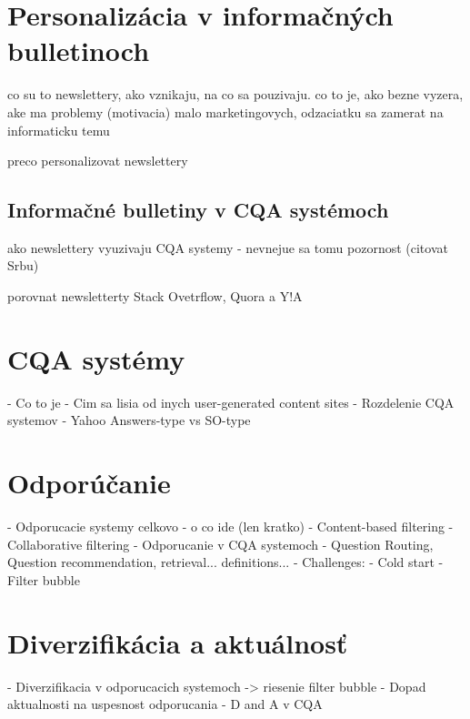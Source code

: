 
\newpage
\chapter{Personalizácia v informačných bulletinoch}

co su to newslettery, ako vznikaju, na co sa pouzivaju.
co to je, ako bezne vyzera, ake ma problemy (motivacia)
malo marketingovych, odzaciatku sa zamerat na informaticku temu

preco personalizovat newslettery

\section{Informačné bulletiny v CQA systémoch}

ako newslettery vyuzivaju CQA systemy - nevnejue sa tomu pozornost (citovat Srbu)

porovnat newsletterty Stack Ovetrflow, Quora a Y!A


\chapter{CQA systémy}

    - Co to je
    - Cim sa lisia od inych user-generated content sites
    - Rozdelenie CQA systemov - Yahoo Answers-type vs SO-type




\chapter{Odporúčanie}

- Odporucacie systemy celkovo - o co ide (len kratko)
    - Content-based filtering
    - Collaborative filtering
- Odporucanie v CQA systemoch
- Question Routing, Question recommendation, retrieval... definitions...
- Challenges:
    - Cold start
    - Filter bubble



\chapter{Diverzifikácia a aktuálnosť}

- Diverzifikacia v odporucacich systemoch -> riesenie filter bubble
- Dopad aktualnosti na uspesnost odporucania
- D and A v CQA
